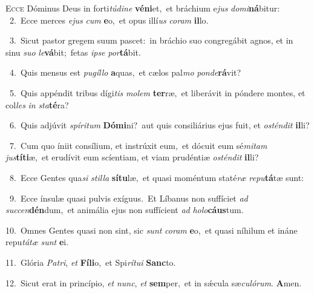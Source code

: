 \lettrine{\initial\textcolor{\initialcolor}{E}}{cce} Dóminus Deus in forti\-\textit{tú}\-\textit{di}\textit{ne} \textbf{vé}\-\textbf{ni}et,~\star et bráchium e\textit{jus} \textit{do}\-\textit{mi}\textbf{ná}bitur:\\
{\numbfont\textcolor{\numbcolor}{~2.}}~Ecce merces \textit{e}\-\textit{jus} \textit{cum} \textbf{e}\-o,~\star et opus illí\textit{us} \textit{co}\-\textit{ram} \textbf{il}\-lo.\par
{\numbfont\textcolor{\numbcolor}{~3.}}~Sicut pastor gregem suum pascet:~\dagger in bráchio suo congregábit agnos, et in sinu \textit{su}\-\textit{o} \textit{le}\-\textbf{vá}bit;~\star fetas \textit{ip}\-\textit{se} \textit{por}\-\textbf{tá}bit.\par
{\numbfont\textcolor{\numbcolor}{~4.}}~Quis mensus est \textit{pu}\-\textit{gíl}\textit{lo} \textbf{a}\-quas,~\star et cælos pal\textit{mo} \textit{pon}\-\textit{de}\textbf{rá}vit?\par
{\numbfont\textcolor{\numbcolor}{~5.}}~Quis appéndit tribus dígi\textit{tis} \textit{mo}\-\textit{lem} \textbf{ter}\-ræ,~\star et liberávit in póndere montes, et col\textit{les} \textit{in} \textit{sta}\-\textbf{té}ra?\par
{\numbfont\textcolor{\numbcolor}{~6.}}~Quis adjúvit \textit{spí}\-\textit{ri}\textit{tum} \textbf{Dó}\-\textbf{mi}ni?~\star aut quis consiliárius ejus fuit, et \textit{os}\-\textit{tén}\textit{dit} \textbf{il}\-li?\par
{\numbfont\textcolor{\numbcolor}{~7.}}~Cum quo íniit consílium, et instrúxit eum,~\dagger et dócuit eum sé\-\textit{mi}\-\textit{tam} \textit{jus}\-\textbf{tí}\textbf{ti}æ,~\star et erudívit eum scíentiam, et viam prudéntiæ \textit{os}\-\textit{tén}\textit{dit} \textbf{il}\-li?\par
{\numbfont\textcolor{\numbcolor}{~8.}}~Ecce Gentes qua\textit{si} \textit{stil}\-\textit{la} \textbf{sí}\-\textbf{tu}læ,~\star et quasi moméntum staté\textit{ræ} \textit{re}\-\textit{pu}\textbf{tá}tæ sunt:\par
{\numbfont\textcolor{\numbcolor}{~9.}}~Ecce ínsulæ quasi pulvis exíguus.~\dagger Et Líbanus non suffíciet \textit{ad} \textit{suc}\-\textit{cen}\textbf{dén}dum,~\star et animália ejus non suffícient \textit{ad} \textit{ho}\-\textit{lo}\textbf{cáus}tum.\par
{\numbfont\textcolor{\numbcolor}{10.}}~Omnes Gentes quasi non sint, sic \textit{sunt} \textit{co}\-\textit{ram} \textbf{e}\-o,~\star et quasi níhilum et ináne repu\-\textit{tá}\-\textit{tæ} \textit{sunt} \textbf{e}\-i.\par
{\numbfont\textcolor{\numbcolor}{11.}}~Glória \textit{Pa}\-\textit{tri}, \textit{et} \textbf{Fí}\-\textbf{li}o,~\star et Spi\-\textit{rí}\-\textit{tu}\textit{i} \textbf{Sanc}\-to.\par
{\numbfont\textcolor{\numbcolor}{12.}}~Sicut erat in princípio, \textit{et} \textit{nunc}\-, \textit{et} \textbf{sem}\-per,~\star et in sǽcula sæ\-\textit{cu}\-\textit{ló}\textit{rum}. \textbf{A}\-men.\par
